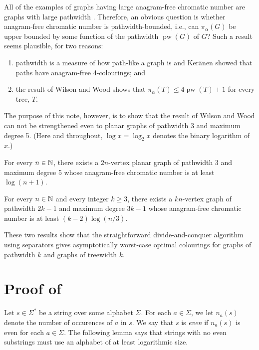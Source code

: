 \documentclass{patmorin}
\DeclareMathOperator{\pw}{pw}
\begin{document}
All of the examples of graphs having large anagram-free chromatic
number are graphs with large pathwidth \cite{robertson.seymour:graph}.
Therefore, an obvious question is whether anagram-free chromatic number
is pathwidth-bounded, i.e., can $\pi_\alpha(G)$ be upper bounded by some
function of the pathwidth $\pw(G)$ of $G$?  Such a result seems plausible,
for two reasons:
\begin{enumerate}
  \item pathwidth is a measure of how path-like a graph is and Ker\"anen
     showed that paths have anagram-free 4-colourings; and
  \item the result of Wilson and Wood \cite{wilson.wood:anagram-free}
     shows that $\pi_\alpha(T)\le 4\pw(T)+1$ for every tree, $T$.
\end{enumerate}
The purpose of this note, however, is to show that the result of Wilson
and Wood can not be strengthened even to planar graphs of pathwidth 3
and maximum degree 5. (Here and throughout, $\log x=\log_2 x$ denotes the binary logarithm of $x$.)

\begin{thm}
  For every $n\in\mathbb{N}$, there exists a $2n$-vertex planar graph of
  pathwidth 3 and maximum degree 5 whose anagram-free chromatic number
  is at least $\log(n+1)$.
\end{thm}


\begin{thm}
  For every $n\in\mathbb{N}$ and every integer $k\ge 3$, there exists a
  $kn$-vertex graph of pathwidth $2k-1$ and maximum degree $3k-1$
  whose anagram-free chromatic number is at least $(k-2)\log(n/3)$.
\end{thm}

These two results show that the straightforward divide-and-conquer
algorithm using separators gives asymptotically worst-case optimal
colourings for graphs of pathwidth $k$ and graphs of treewidth $k$.




\section{Proof of }

Let $s\in\Sigma^*$ be a string over some alphabet $\Sigma$.  For each
$a\in\Sigma$, we let $n_a(s)$ denote the number of occurences of $a$
in $s$.  We say that $s$ is \emph{even} if $n_a(s)$ is even for each
$a\in\Sigma$.  The following lemma says that strings with no even
substrings must use an alphabet of at least logarithmic size.
\end{document}
